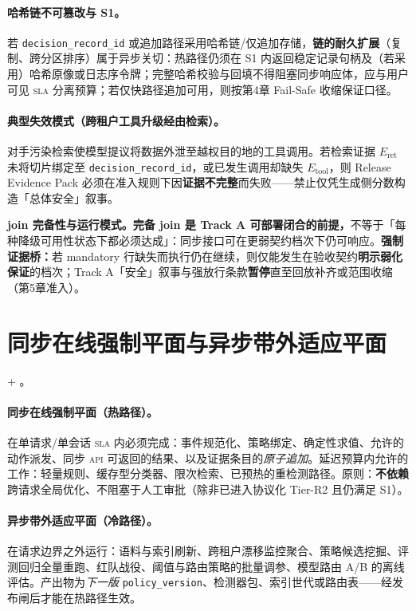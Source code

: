 \documentclass[11pt,a4paper]{report}
\begin{document}
\paragraph{哈希链不可篡改与 S1。}若 \texttt{decision\_record\_id} 或追加路径采用哈希链/仅追加存储，\textbf{链的耐久扩展}（复制、跨分区排序）属于异步关切：热路径仍须在 S1 内返回稳定记录句柄及（若采用）哈希原像或日志序令牌；完整哈希校验与回填不得阻塞同步响应体，应与用户可见 \textsc{sla} 分离预算；若仅快路径追加可用，则按第4章 Fail-Safe 收缩保证口径。

\paragraph{典型失效模式（跨租户工具升级经由检索）。}对手污染检索使模型提议将数据外泄至越权目的地的工具调用。若检索证据 $E_{\mathrm{ret}}$ 未将切片绑定至 \texttt{decision\_record\_id}，或已发生调用却缺失 $E_{\mathrm{tool}}$，则 Release Evidence Pack 必须在准入规则下因\textbf{证据不完整}而失败——禁止仅凭生成侧分数构造「总体安全」叙事。

\noindent\textbf{join 完备性与运行模式。}\textbf{完备 join 是 Track A 可部署闭合的前提，}不等于「每种降级可用性状态下都必须达成」：同步接口可在更弱契约档次下仍可响应。\textbf{强制证据桥：}若 mandatory 行缺失而执行仍在继续，则仅能发生在验收契约\textbf{明示弱化保证}的档次；Track A「安全」叙事与强放行条款\textbf{暂停}直至回放补齐或范围收缩（第5章准入）。

\section{同步在线强制平面与异步带外适应平面}
\ControlPlane{} + \DecoupledSafety{}。

\paragraph{同步在线强制平面（热路径）。}在单请求/单会话 \textsc{sla} 内必须完成：事件规范化、策略绑定、确定性求值、允许的动作派发、同步 \textsc{api} 可返回的结果、以及证据条目的\emph{原子追加}。延迟预算内允许的工作：轻量规则、缓存型分类器、限次检索、已预热的重检测路径。原则：\textbf{不依赖}跨请求全局优化、不阻塞于人工审批（除非已进入协议化 Tier-R2 且仍满足 S1）。

\paragraph{异步带外适应平面（冷路径）。}在请求边界之外运行：语料与索引刷新、跨租户漂移监控聚合、策略候选挖掘、评测回归全量重跑、红队战役、阈值与路由策略的批量调参、模型路由 A/B 的离线评估。产出物为\emph{下一版} \texttt{policy\_version}、检测器包、索引世代或路由表——经发布闸后才能在热路径生效。
\end{document}

